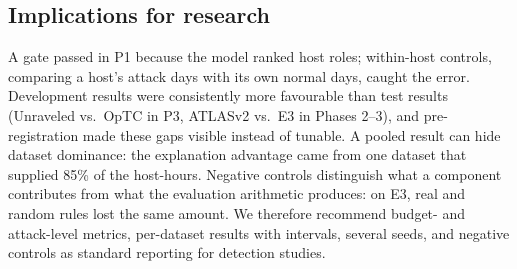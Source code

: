 \documentclass[acmlarge,screen,review]{acmart}
\begin{document}
\subsection{Implications for research}
A gate passed in P1 because the model ranked host roles; within-host controls, comparing a host's attack days with its
own normal days, caught the error. Development results were consistently more favourable than test results (Unraveled
vs.\ OpTC in P3, ATLASv2 vs.\ E3 in Phases 2--3), and pre-registration made these gaps visible instead of tunable. A
pooled result can hide dataset dominance: the explanation advantage came from one dataset that supplied 85\% of the
host-hours. Negative controls distinguish what a component contributes from what the evaluation arithmetic produces:
on E3, real and random rules lost the same amount. We therefore recommend budget- and attack-level metrics,
per-dataset results with intervals, several seeds, and negative controls as standard reporting for detection studies.
\end{document}
